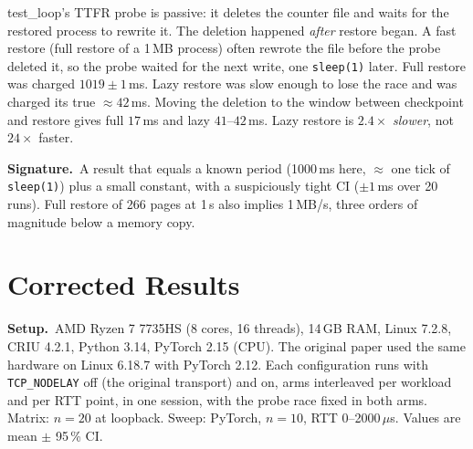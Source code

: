 \documentclass[conference]{IEEEtran}
\newcommand{\nd}{\texttt{TCP\_NODELAY}\xspace}
\newcommand{\us}{\,$\mu$s\xspace}
\begin{document}
test\_loop's TTFR probe is passive: it deletes the counter file and waits for
the restored process to rewrite it. The deletion happened \emph{after} restore
began. A fast restore (full restore of a 1\,MB process) often rewrote the file
before the probe deleted it, so the probe waited for the next write, one
\texttt{sleep(1)} later. Full restore was charged $1019\pm1$\,ms. Lazy restore
was slow enough to lose the race and was charged its true ${\approx}42$\,ms.
Moving the deletion to the window between checkpoint and restore gives full
$17$\,ms and lazy $41$--$42$\,ms. Lazy restore is $2.4\times$ \emph{slower},
not $24\times$ faster.

\textbf{Signature.}\, A result that equals a known period (1000\,ms here,
${\approx}$ one tick of \texttt{sleep(1)}) plus a small constant, with a
suspiciously tight CI ($\pm1$\,ms over 20 runs). Full restore of 266 pages at
1\,s also implies 1\,MB/s, three orders of magnitude below a memory copy.

\section{Corrected Results}
\label{sec:corrected}

\textbf{Setup.}\, AMD Ryzen 7 7735HS (8 cores, 16 threads), 14\,GB RAM, Linux
7.2.8, CRIU 4.2.1, Python 3.14, PyTorch 2.15 (CPU). The original paper used
the same hardware on Linux 6.18.7 with PyTorch 2.12. Each configuration runs
with \nd off (the original transport) and on, arms interleaved per workload
and per RTT point, in one session, with the probe race fixed in both arms.
Matrix: $n\!=\!20$ at loopback. Sweep: PyTorch, $n\!=\!10$, RTT 0--2000\us.
Values are mean $\pm$ 95\,\% CI.
\end{document}
